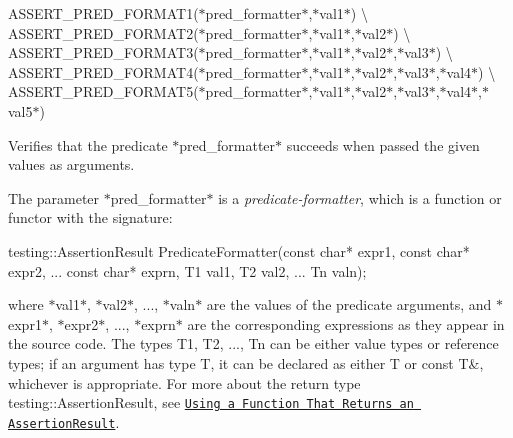 {\ttfamily A\+S\+S\+E\+R\+T\+\_\+\+P\+R\+E\+D\+\_\+\+F\+O\+R\+M\+A\+T1(}$\ast${\ttfamily pred\+\_\+formatter}$\ast${\ttfamily ,}$\ast${\ttfamily val1}$\ast${\ttfamily )} \textbackslash{} {\ttfamily A\+S\+S\+E\+R\+T\+\_\+\+P\+R\+E\+D\+\_\+\+F\+O\+R\+M\+A\+T2(}$\ast${\ttfamily pred\+\_\+formatter}$\ast${\ttfamily ,}$\ast${\ttfamily val1}$\ast${\ttfamily ,}$\ast${\ttfamily val2}$\ast${\ttfamily )} \textbackslash{} {\ttfamily A\+S\+S\+E\+R\+T\+\_\+\+P\+R\+E\+D\+\_\+\+F\+O\+R\+M\+A\+T3(}$\ast${\ttfamily pred\+\_\+formatter}$\ast${\ttfamily ,}$\ast${\ttfamily val1}$\ast${\ttfamily ,}$\ast${\ttfamily val2}$\ast${\ttfamily ,}$\ast${\ttfamily val3}$\ast${\ttfamily )} \textbackslash{} {\ttfamily A\+S\+S\+E\+R\+T\+\_\+\+P\+R\+E\+D\+\_\+\+F\+O\+R\+M\+A\+T4(}$\ast${\ttfamily pred\+\_\+formatter}$\ast${\ttfamily ,}$\ast${\ttfamily val1}$\ast${\ttfamily ,}$\ast${\ttfamily val2}$\ast${\ttfamily ,}$\ast${\ttfamily val3}$\ast${\ttfamily ,}$\ast${\ttfamily val4}$\ast${\ttfamily )} \textbackslash{} {\ttfamily A\+S\+S\+E\+R\+T\+\_\+\+P\+R\+E\+D\+\_\+\+F\+O\+R\+M\+A\+T5(}$\ast${\ttfamily pred\+\_\+formatter}$\ast${\ttfamily ,}$\ast${\ttfamily val1}$\ast${\ttfamily ,}$\ast${\ttfamily val2}$\ast${\ttfamily ,}$\ast${\ttfamily val3}$\ast${\ttfamily ,}$\ast${\ttfamily val4}$\ast${\ttfamily ,}$\ast${\ttfamily val5}$\ast${\ttfamily )}

Verifies that the predicate $\ast${\ttfamily pred\+\_\+formatter}$\ast$ succeeds when passed the given values as arguments.

The parameter $\ast${\ttfamily pred\+\_\+formatter}$\ast$ is a {\itshape predicate-\/formatter}, which is a function or functor with the signature\+:


\begin{DoxyCode}
testing::AssertionResult PredicateFormatter(\textcolor{keyword}{const} \textcolor{keywordtype}{char}* expr1,
                                            \textcolor{keyword}{const} \textcolor{keywordtype}{char}* expr2,
                                            ...
                                            \textcolor{keyword}{const} \textcolor{keywordtype}{char}* exprn,
                                            T1 val1,
                                            T2 val2,
                                            ...
                                            Tn valn);
\end{DoxyCode}


where $\ast${\ttfamily val1}$\ast$, $\ast${\ttfamily val2}$\ast$, ..., $\ast${\ttfamily valn}$\ast$ are the values of the predicate arguments, and $\ast${\ttfamily expr1}$\ast$, $\ast${\ttfamily expr2}$\ast$, ..., $\ast${\ttfamily exprn}$\ast$ are the corresponding expressions as they appear in the source code. The types {\ttfamily T1}, {\ttfamily T2}, ..., {\ttfamily Tn} can be either value types or reference types; if an argument has type {\ttfamily T}, it can be declared as either {\ttfamily T} or {\ttfamily const T\&}, whichever is appropriate. For more about the return type {\ttfamily testing\+::\+Assertion\+Result}, see \href{../advanced.md#using-a-function-that-returns-an-assertionresult}{\tt Using a Function That Returns an Assertion\+Result}.

